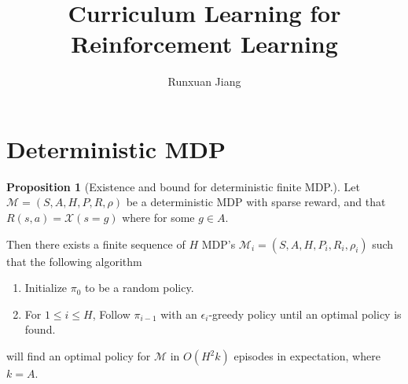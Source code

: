 \documentclass[12pt, letterpaper]{article}
\title{Curriculum Learning for Reinforcement Learning}
\author{Runxuan Jiang}
\date{}
\theoremstyle{definition}
\newtheorem*{prop}{Proposition}
\theoremstyle{remark}
\begin{document}
\maketitle

\section{Deterministic MDP}

\begin{prop}[Existence and bound for deterministic finite MDP.]
    Let \(\mathcal{M} = (S, A, H, P, R, \rho)\) be a deterministic MDP with sparse reward, and that \(R(s, a) = \mathcal{X}(s = g)\) where for some \(g \in A\).
    
    Then there exists a finite sequence of $H$ MDP's \(\mathcal{M}_i = (S, A, H, P_i, R_i, \rho_i)\) such that the following algorithm

    \begin{enumerate}
        \item Initialize \(\pi_0\) to be a random policy.
        \item For \(1 \leq i \leq H\), Follow \(\pi_{i-1}\) with an \(\epsilon_i\)-greedy policy until an optimal policy is found.
    \end{enumerate}

    will find an optimal policy for \(\mathcal{M}\) in \(O(H^2k)\) episodes in expectation, where \(k = A\).
    
\end{prop}
\end{document}
